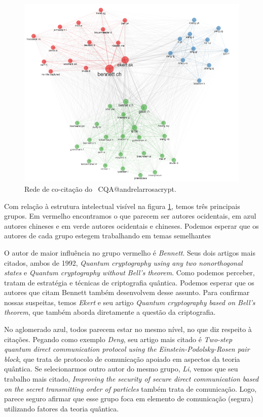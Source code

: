 \begin{figure}
    \centering
    \includegraphics[angle=0,width=1\textwidth]{experiments/andrelarrosacrypt/AnaliseBibliometrica/CriptografiaQuantica/imagens/CQA@andrelarrosacrypt_CoCit.png}
    \caption{Rede de co-citação do \dataset\ CQA@andrelarrosacrypt.}
    \label{CQA@andrelarrosacrypt_CoCit}
\end{figure}

Com relação à estrutura intelectual visível na figura \ref{CQA@andrelarrosacrypt_CoCit}, temos três principais grupos. Em vermelho encontramos o que parecem ser autores ocidentais, em azul autores chineses e em verde autores ocidentais e chineses. Podemos esperar que os autores de cada grupo estegem trabalhando em temas semelhantes

O autor de maior influência no grupo vermelho é \textit{Bennett}. Seus dois artigos mais citados, ambos de 1992, \textit{Quantum cryptography using any two nonorthogonal states} e \textit{Quantum cryptography without Bell’s theorem}. Como podemos perceber, tratam de estratégia e técnicas de criptografia quântica. Podemos esperar que os autores que citam Bennett também desenvolvem desse assunto. Para confirmar nossas suspeitas, temos \textit{Ekert} e seu artigo \textit{Quantum cryptography based on Bell’s theorem}, que também aborda diretamente a questão da criptografia.

No aglomerado azul, todos parecem estar no mesmo nível, no que diz respeito à citações. Pegando como exemplo \textit{Deng}, seu artigo mais citado é \textit{Two-step quantum direct communication protocol using the Einstein-Podolsky-Rosen pair block}, que trata de protocolo de comunicação apoiado em aspectos da teoria quântica. Se selecionarmos outro autor do mesmo grupo, \textit{Li}, vemos que seu trabalho mais citado, \textit{Improving the security of secure direct communication based on the secret transmitting order of particles} também trata de comunicação. Logo, parece seguro afirmar que esse grupo foca em elemento de comunicação (segura) utilizando fatores da teoria quântica.

